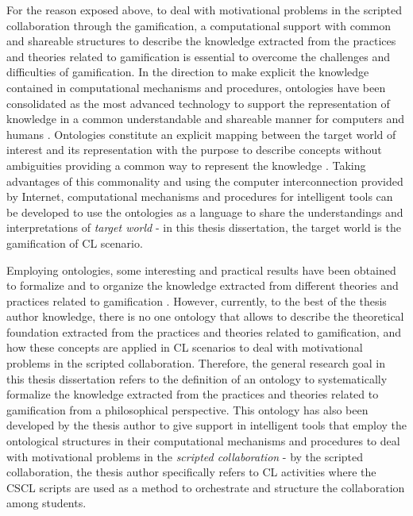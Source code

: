 For the reason exposed above, to deal with motivational problems in the scripted collaboration through the gamification, a computational support with common and shareable structures to describe the knowledge extracted from the practices and theories related to gamification is essential to overcome the challenges and difficulties of gamification.
In the direction to make explicit the knowledge contained in computational mechanisms and procedures, ontologies have been consolidated as the most advanced technology to support the representation of knowledge in a common understandable and shareable manner for computers and humans \cite{AsikriLaassiriKritChaib2016, Devedzic2006, MizoguchiBourdeau2016}.
Ontologies constitute an explicit mapping between the target world of interest and its representation with the purpose to describe concepts without ambiguities providing a common way to represent the knowledge \cite{GuarinoOberleStaab2009}.
Taking advantages of this commonality and using the computer interconnection provided by Internet, computational mechanisms and procedures for intelligent tools can be developed to use the ontologies as a language to share the understandings and interpretations of \emph{target world} - in this thesis dissertation, the target world is the gamification of CL scenario.

Employing ontologies, some interesting and practical results have been obtained to formalize and to organize the knowledge extracted from different theories and practices related to gamification \cite{DermevalVilelaBittencourtCastroIsotaniBritoSilva2016, KarkarAlJa'amFoufou2016, ZouaqNkambou2010}.
However, currently, to the best of the thesis author knowledge, there is no one ontology that allows to describe the theoretical foundation extracted from the practices and theories related to gamification, and how these concepts are applied in CL scenarios to deal with motivational problems in the scripted collaboration.
Therefore, the general research goal in this thesis dissertation refers to the definition of an ontology to systematically formalize the knowledge extracted from the practices and theories related to gamification from a philosophical perspective.
This ontology has also been developed by the thesis author to give support in intelligent tools that employ the ontological structures in their computational mechanisms and procedures to deal with motivational problems in  the \emph{scripted collaboration} -
by the scripted collaboration, the thesis author specifically refers to CL activities where the CSCL scripts are used as a method to orchestrate and structure the collaboration among students.

